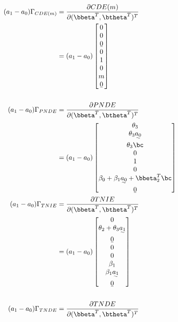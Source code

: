 \documentclass[dvipdfmx,10pt]{article}
\begin{document}
\begin{align*}
  (a_{1}-a_{0})\Gamma_{CDE(m)}
  &= \frac{\partial CDE(m)}{\partial (\bbeta^{T},\btheta^{T})^{T}}\\
  &= (a_{1}-a_{0})
    \begin{bmatrix}
      0\\
      0\\
      \b0\\
      0\\
      1\\
      0\\
      m\\
      \b0\\
    \end{bmatrix}\\
  \\
  (a_{1}-a_{0})\Gamma_{PNDE}
  &= \frac{\partial PNDE}{\partial (\bbeta^{T},\btheta^{T})^{T}}\\
  &= (a_{1}-a_{0})
    \begin{bmatrix}
      \theta_{3}\\
      \theta_{3}\uwave{a_{0}}\\
      \theta_{3}\bc\\
      0\\
      1\\
      0\\
      \beta_{0} + \beta_{1}\uwave{a_{0}} + \bbeta_{2}^{T}\bc\\
      \b0\\
    \end{bmatrix}\\
  (a_{1}-a_{0})\Gamma_{TNIE}
  &= \frac{\partial TNIE}{\partial (\bbeta^{T},\btheta^{T})^{T}}\\
  &= (a_{1}-a_{0})
    \begin{bmatrix}
      0\\
      \theta_{2} + \theta_{3}\uwave{a_{1}}\\
      \b0\\
      0\\
      0\\
      \beta_{1}\\
      \beta_{1}\uwave{a_{1}}\\
      \b0\\
    \end{bmatrix}\\
  \\
  (a_{1}-a_{0})\Gamma_{TNDE}
  &= \frac{\partial TNDE}{\partial (\bbeta^{T},\btheta^{T})^{T}}\\

\end{align*}
\end{document}

